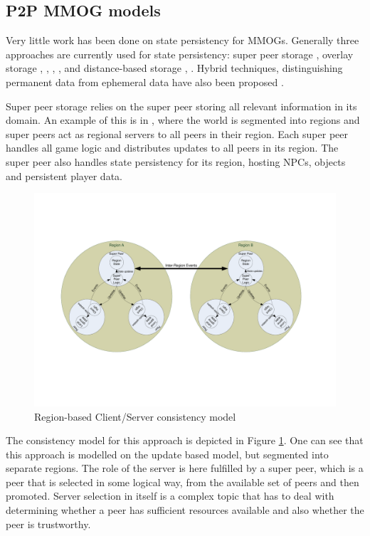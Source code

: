 \documentclass[journal,oneside,a4paper,onecolumn]{IEEEtran}
\begin{document}
\subsection{P2P MMOG models}

Very little work has been done on state persistency for MMOGs. Generally three approaches are currently used for state persistency: super peer storage \cite{knutsson_p2p_first}, overlay storage \cite{Douglas05enablingmassively}, \cite{using_freenet_storage}, \cite{overlay_storage1}, \cite{Fan_phd}, \cite{past_storage_focus} and distance-based storage \cite{Buyukkaya_voronoi_state_management}, \cite{Hu_voronoi_IM}. Hybrid techniques, distinguishing permanent data from ephemeral data have also been proposed \cite{zoned_federation}.

Super peer storage relies on the super peer storing all relevant information in its domain. An example of this is in \cite{knutsson_p2p_first}, where the world is segmented into regions and super peers act as regional servers to all peers in their region. Each super peer handles all game logic and distributes updates to all peers in its region. The super peer also handles state persistency for its region, hosting NPCs, objects and persistent player data.

\begin{figure}[htbp]
 \centering
 \includegraphics[clip=true, viewport=2cm 5cm 27cm 16.5cm, width=\columnwidth]{region_based_CS_CM}
 \caption{Region-based Client/Server consistency model}
 \label{fig_cs_region_cm}
\end{figure}
%
The consistency model for this approach is depicted in Figure \ref{fig_cs_region_cm}. One can see that this approach is modelled on the update based model, but segmented into separate regions. The role of the server is here fulfilled by a super peer, which is a peer that is selected in some logical way, from the available set of peers and then promoted. Server selection in itself is a complex topic that has to deal with determining whether a peer has sufficient resources available and also whether the peer is trustworthy.
\end{document}
